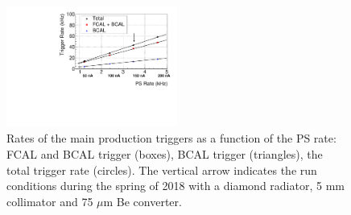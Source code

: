 
\begin{figure}[tbp]
\begin{center}
\includegraphics[width=0.5\textwidth]{figures/plot_triggerL1_c1}  
\caption{Rates of the main production triggers as a function of the PS rate: FCAL and BCAL trigger (boxes), BCAL trigger (triangles), the total trigger rate (circles). The vertical arrow indicates the run conditions during the spring of 2018 with a diamond
radiator, 5 mm collimator and 75 $\mu$m Be converter.} \label{fig:trig_rate}
\end{center}
\end{figure}
